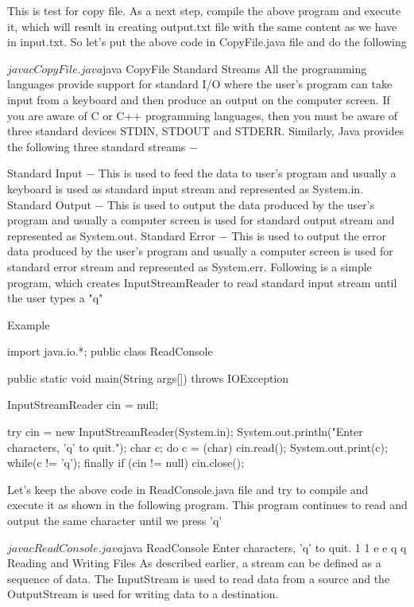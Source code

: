 This is test for copy file.
As a next step, compile the above program and execute it, which will result in creating output.txt file with the same content as we have in input.txt. So let's put the above code in CopyFile.java file and do the following

$javac CopyFile.java
$java CopyFile
Standard Streams
All the programming languages provide support for standard I/O where the user's program can take input from a keyboard and then produce an output on the computer screen. If you are aware of C or C++ programming languages, then you must be aware of three standard devices STDIN, STDOUT and STDERR. Similarly, Java provides the following three standard streams −

Standard Input − This is used to feed the data to user's program and usually a keyboard is used as standard input stream and represented as System.in.
Standard Output − This is used to output the data produced by the user's program and usually a computer screen is used for standard output stream and represented as System.out.
Standard Error − This is used to output the error data produced by the user's program and usually a computer screen is used for standard error stream and represented as System.err.
Following is a simple program, which creates InputStreamReader to read standard input stream until the user types a "q"

Example

import java.io.*;
public class ReadConsole {

   public static void main(String args[]) throws IOException {
      InputStreamReader cin = null;

      try {
         cin = new InputStreamReader(System.in);
         System.out.println("Enter characters, 'q' to quit.");
         char c;
         do {
            c = (char) cin.read();
            System.out.print(c);
         } while(c != 'q');
      }finally {
         if (cin != null) {
            cin.close();
         }
      }
   }
}
Let's keep the above code in ReadConsole.java file and try to compile and execute it as shown in the following program. This program continues to read and output the same character until we press 'q'

$javac ReadConsole.java
$java ReadConsole
Enter characters, 'q' to quit.
1
1
e
e
q
q
Reading and Writing Files
As described earlier, a stream can be defined as a sequence of data. The InputStream is used to read data from a source and the OutputStream is used for writing data to a destination.

